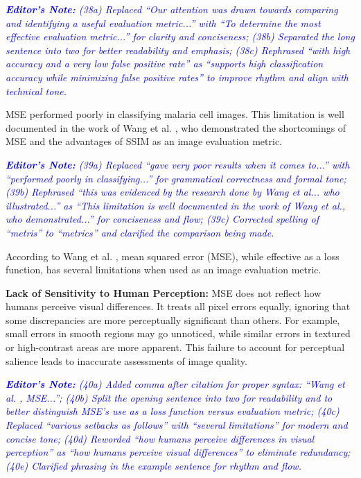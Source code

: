 \documentclass[journal,12pt,onecolumn,draftcls]{IEEEtran}
\newcommand{\editornote}[1]{\par\textit{\textcolor{blue}{\textbf{Editor's Note:} #1}}\par}
\begin{document}
\editornote{(38a) Replaced “Our attention was drawn towards comparing and identifying a useful evaluation metric...” with “To determine the most effective evaluation metric...” for clarity and conciseness; 
(38b) Separated the long sentence into two for better readability and emphasis; 
(38c) Rephrased “with high accuracy and a very low false positive rate” as “supports high classification accuracy while minimizing false positive rates” to improve rhythm and align with technical tone.}

MSE performed poorly in classifying malaria cell images. This limitation is well documented in the work of Wang et al. \cite{wang2009}, who demonstrated the shortcomings of MSE and the advantages of SSIM as an image evaluation metric.

\editornote{(39a) Replaced “gave very poor results when it comes to...” with “performed poorly in classifying...” for grammatical correctness and formal tone;
(39b) Rephrased “this was evidenced by the research done by Wang et al... who illustrated...” as “This limitation is well documented in the work of Wang et al., who demonstrated...” for conciseness and flow;
(39c) Corrected spelling of “metris” to “metrics” and clarified the comparison being made.}

According to Wang et al. \cite{wang2009}, mean squared error (MSE), while effective as a loss function, has several limitations when used as an image evaluation metric.

\textbf{Lack of Sensitivity to Human Perception:} MSE does not reflect how humans perceive visual differences. It treats all pixel errors equally, ignoring that some discrepancies are more perceptually significant than others. For example, small errors in smooth regions may go unnoticed, while similar errors in textured or high-contrast areas are more apparent. This failure to account for perceptual salience leads to inaccurate assessments of image quality.

\editornote{(40a) Added comma after citation for proper syntax: “Wang et al. \cite{wang2009}, MSE...”;
(40b) Split the opening sentence into two for readability and to better distinguish MSE’s use as a loss function versus evaluation metric;
(40c) Replaced “various setbacks as follows” with “several limitations” for modern and concise tone;
(40d) Reworded “how humans perceive differences in visual perception” as “how humans perceive visual differences” to eliminate redundancy;
(40e) Clarified phrasing in the example sentence for rhythm and flow.}
\end{document}
